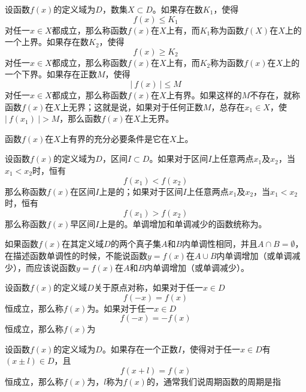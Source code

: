 \begin{definition}[函数的有界性]
	设函数\( f(x) \)的定义域为\( D \)，数集\( X \subset D \)。如果存在数\( K_{1} \)，使得
	\[ f(x) \leqslant K_{1} \]
	对任一\( x \in X \)都成立，那么称函数\( f(x) \)在\( X \)上有，而\( K_{1} \)称为函数\( f(X) \)在\( X \)上的一个上界。如果存在数\( K_{2} \)，使得
	\[ f(x) \geqslant K_{2} \]
	对任一\( x \in X \)都成立，那么称函数\( f(x) \)在\( X \)上有，而\( K_{2} \)称为函数\( f(x) \)在\( X \)上的一个下界。如果存在正数\( M \)，使得
	\[ |\ f(x)\ | \leqslant M \]
	对任一\( x \in X \)都成立，那么称函数\( f(x) \)在\( X \)上有界。如果这样的\( M \)不存在，就称函数\( f(x) \)在\( X \)上无界；这就是说，如果对于任何正数\( M \)，总存在\( x_{1} \in X \)，使\( |\ f(x_{1})\ | > M \)，那么函数\( f(x) \)在\( X \)上无界。
\end{definition}

\begin{note}
	函数\( f(x) \)在\( X \)上有界的{\heiti 充分必要条件}是它在\( X \)上。
\end{note}

\begin{definition}[函数的单调性]
	设函数\( f(x) \)的定义域为\( D \)，区间\( I \subset D \)。如果对于区间\( I \)上任意两点\( x_{1} \)及\( x_{2} \)，当\( x_{1} < x_{2} \)时，恒有
	\[ f(x_{1}) < f(x_{2}) \]
	那么称函数\( f(x) \)在区间\( I \)上是的；如果对于区间\( I \)上任意两点\( x_{1} \)及\( x_{2} \)，当\( x_{1} < x_{2} \)时，恒有
	\[ f(x_{1}) > f(x_{2}) \]
	那么称函数\( f(x) \)早区间\( I \)上是的。单调增加和单调减少的函数统称为。
\end{definition}

\begin{note}
	如果函数\( f(x) \)在其定义域\( D \)的两个真子集\( A \)和\( B \)内单调性相同，并且\( A \cap B = \emptyset \)，在描述函数单调性的时候，不能说函数\( y=f(x) \)在\( A \cup B \)内单调增加（或单调减少），而应该说函数\( y = f(x) \)在\( A \)和\( B \)内单调增加（或单调减少）。
\end{note}

\begin{definition}[函数的奇偶性]
	设函数\( f(x) \)的定义域\( D \)关于原点对称，如果对于任一\( x \in D \)
	\[ f(-x) = f(x) \]
	恒成立，那么称\( f(x) \)为。如果对于任一\( x \in D \)
	\[ f(-x) = -f(x) \]
	恒成立，那么称\( f(x) \)为
\end{definition}

\begin{definition}[函数的周期性]
	设函数\( f(x) \)的定义域为\( D \)。如果存在一个正数\( I \)，使得对于任一\( x \in D \)有\( (x \pm l) \in D \)，且
	\[ f(x + l) = f(x) \]
	恒成立，那么称\( f(x) \)为，\( l \)称为\( f(x) \)的，通常我们说周期函数的周期是指
\end{definition}

